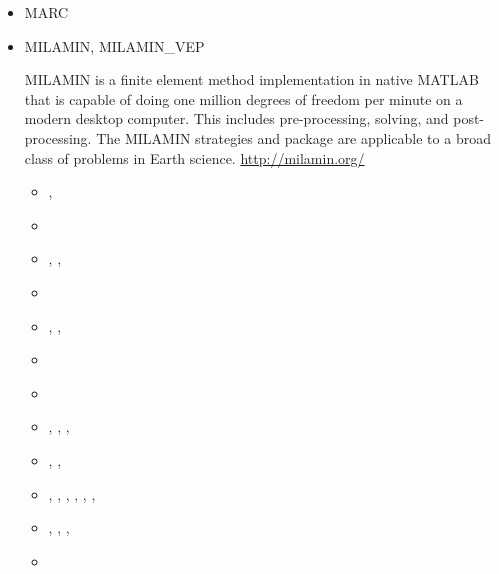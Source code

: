 \begin{itemize}
\begin{scriptsize}
\textcite{afrf07}
\textcite{affr08}
\textcite{fuac09}
\textcite{fufa10}
\textcite{jitf19}
\end{scriptsize}

\item MARC

\begin{scriptsize}
\noindent
\textcite{nesg97}
\textcite{nesb99}
\end{scriptsize}


\item {\codefont MILAMIN, MILAMIN\_VEP} 

MILAMIN is a finite element method implementation in native MATLAB that is capable 
of doing one million degrees of freedom per minute on a modern desktop computer. 
This includes pre-processing, solving, and post-processing. The MILAMIN strategies and 
package are applicable to a broad class of problems in Earth science. \url{http://milamin.org/}

\begin{scriptsize}
\begin{itemize}
\item[\twothousandeight]     \textcite{daks08},  \textcite{scdk08}
\item[\twothousandnine]      \textcite{gogk09}
\item[\twothousandten]       \textcite{krda10},  \textcite{kaus10},  \textcite{dekc10}
\item[\twothousandeleven]    \textcite{yakm11}
\item[\twothousandtwelve]    \textcite{gebk12},  \textcite{rukb12},  \textcite{thka12}
\item[\twothousandthirteen]  \textcite{scpo13}
\item[\twothousandfourteen]  \textcite{jobk14}
\item[\twothousandfifteen]   \textcite{lukz15},  \textcite{gehm15},  
                             \textcite{thkp15},  \textcite{musd15}
\item[\twothousandsixteen]   \textcite{jads16},  \textcite{maka16},  \textcite{cakp16}
\item[\twothousandeighteen]  \textcite{dusd18},  \textcite{jasc18},  \textcite{jadg18},
                             \textcite{comj18},  \textcite{jens18},  \textcite{rabw18},
                             \textcite{chsm18}
\item[\twothousandnineteen]  \textcite{sifg19},  \textcite{baba19},
                             \textcite{sogh19},  \textcite{anpa19}
\item[\twothousandtwenty]    \textcite{hube20}
\end{itemize}
\end{scriptsize}


\end{itemize}
